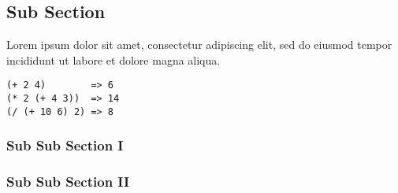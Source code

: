 \subsection{Sub Section} \label{Sub Section}

Lorem ipsum dolor sit amet, consectetur adipiscing elit, sed do eiusmod tempor incididunt ut labore et dolore magna aliqua. 

\begin{lstlisting}
(+ 2 4)        => 6
(* 2 (+ 4 3))  => 14
(/ (+ 10 6) 2) => 8
\end{lstlisting} 
\vspace{3mm}

\subsubsection{Sub Sub Section I} \label{Sub Sub Section 1}

\subsubsection{Sub Sub Section II} \label{Sub Sub Section 2}
